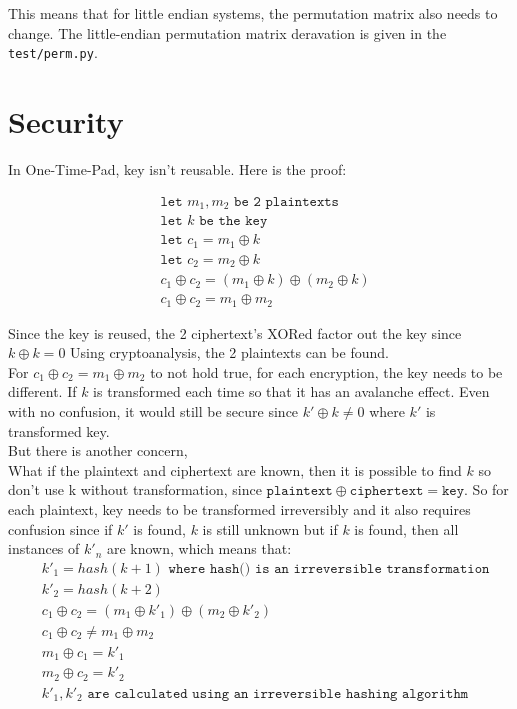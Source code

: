 \documentclass[fleqn, a4paper,12pt]{article}
\begin{document}
This means that for little endian systems, the permutation matrix also needs to change. The little-endian permutation matrix deravation is given in the \texttt{test/perm.py}.

\section{Security}
\setlength{\mathindent}{3pt} %

In One-Time-Pad, key isn't reusable. Here is the proof:

\[
\begin{aligned}
&\texttt{let }  m_1, m_2 \texttt{ be 2 plaintexts} \\
&\texttt{let }  k \texttt{ be the key} \\
&\texttt{let }  c_1 = m_1 \oplus k \\
&\texttt{let }  c_2 = m_2 \oplus k \\
&c_1 \oplus c_2 = (m_1 \oplus k) \oplus (m_2 \oplus k) \\
&c_1 \oplus c_2 = m_1 \oplus m_2
\end{aligned}
\]

Since the key is reused, the 2 ciphertext's XORed factor out the key since $k \oplus k = 0$
Using cryptoanalysis, the 2 plaintexts can be found. 
\\
For $c_1 \oplus c_2 = m_1 \oplus m_2$ to not hold true, for each encryption, the key needs to be different. If $k$ is transformed each time so that it has an avalanche effect. Even with no confusion, it would still be secure since $k' \oplus k \neq  0$ where $k'$ is transformed key. 
\\
But there is another concern,
\\
What if the plaintext and ciphertext are known, then it is possible to find $k$ so don't use k without transformation, since $\texttt{plaintext} \oplus \texttt{ciphertext} = \texttt{key}$. So for each plaintext, key needs to be transformed irreversibly and it also requires confusion since if $k'$ is found, $k$ is still unknown but if $k$ is found, then all instances of $k'_n$ are known, which means that: 
\[
\begin{aligned}
&k'_1 = hash(k+1) \texttt{ where hash() is an irreversible transformation} \\
&k'_2 = hash(k+2) \\
&c_1 \oplus c_2 = (m_1 \oplus k'_1) \oplus (m_2 \oplus k'_2) \\
&c_1 \oplus c_2 \neq m_1 \oplus m_2 \\
&m_1 \oplus c_1 = k'_1 \\
&m_2 \oplus c_2 = k'_2 \\
&k'_1, k'_2 \texttt{  are calculated using an irreversible hashing algorithm }
\end{aligned}
\]
\\
\end{document}
